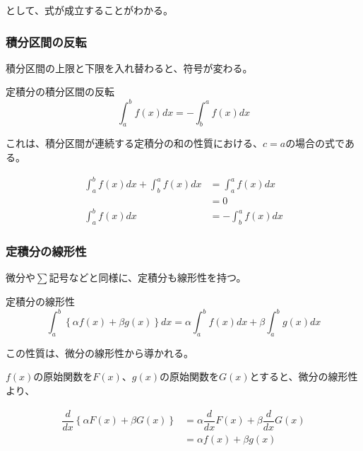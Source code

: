 \documentclass[../math-imaging]{subfiles}
\begin{document}
として、式が成立することがわかる。

\subsubsection{積分区間の反転}

積分区間の上限と下限を入れ替わると、符号が変わる。

\begin{theorem}{定積分の積分区間の反転}
  \LARGE
  \begin{equation}
    \int_{a}^{b} f(x) dx = -\int_{b}^{a} f(x) dx
  \end{equation}
\end{theorem}

これは、積分区間が連続する定積分の和の性質における、$c=a$の場合の式である。

\begin{align}
  \int_{a}^{b} f(x) dx + \int_{b}^{a} f(x) dx & = \int_{a}^{a} f(x) dx  \\
                                              & = 0                     \\
  \int_{a}^{b} f(x) dx                        & = -\int_{b}^{a} f(x) dx
\end{align}

\subsubsection{定積分の線形性}

微分や$\sum$記号などと同様に、定積分も線形性を持つ。

\begin{theorem}{定積分の線形性}
  \Large
  \begin{equation}
    \int_{a}^{b} \left\{ \alpha f(x) + \beta g(x) \right\} dx = \alpha \int_{a}^{b} f(x) dx + \beta \int_{a}^{b} g(x) dx
  \end{equation}
\end{theorem}

この性質は、微分の線形性から導かれる。

$f(x)$の原始関数を$F(x)$、$g(x)$の原始関数を$G(x)$とすると、微分の線形性より、

\begin{align}
  \dfrac{d}{dx} \left\{ \alpha F(x) + \beta G(x) \right\} & = \alpha \dfrac{d}{dx} F(x) + \beta \dfrac{d}{dx} G(x) \\
                                                          & = \alpha f(x) + \beta g(x)
\end{align}
\end{document}
